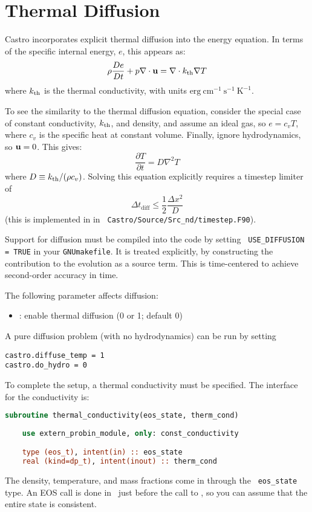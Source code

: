 \label{ch:diffusion}

\section{Thermal Diffusion}

Castro incorporates explicit thermal diffusion into the energy equation.  
In terms of the specific internal energy, $e$, this appears as:
\begin{equation}
\rho \frac{De}{Dt} + p \nabla \cdot {\bf u} = \nabla \cdot {k_\mathrm{th}} \nabla T
\end{equation}
where ${k_\mathrm{th}}$ is the thermal conductivity, with units
$\mathrm{erg~cm^{-1}~s^{-1}~K^{-1}}$.

To see the similarity to the thermal diffusion equation, consider the special
case of constant conductivity, ${k_\mathrm{th}}$, and density, and assume an
ideal gas, so $e = c_v T$, where $c_v$ is the specific heat at constant volume.
Finally, ignore hydrodynamics, so ${\bf u} = 0$.  This gives:
\begin{equation}
\frac{\partial T}{\partial t} = D \nabla^2 T
\end{equation}
where $D \equiv {k_\mathrm{th}}/(\rho c_v)$.  Solving this equation
explicitly requires a timestep limiter of
\begin{equation}
\Delta t_\mathrm{diff} \le \frac{1}{2} \frac{\Delta x^2}{D}
\end{equation}
(this is implemented in  in {\tt
  Castro/Source/Src\_nd/timestep.F90}).

Support for diffusion must be compiled into the code by setting {\tt
  USE\_DIFFUSION = TRUE} in your {\tt GNUmakefile}.  It is treated
explicitly, by constructing the contribution to the evolution as a
source term.  This is time-centered to achieve second-order accuracy
in time.

The following parameter affects diffusion:
\begin{itemize}
\item {}:  enable thermal diffusion (0 or 1; default 0)
\end{itemize}

A pure diffusion problem (with no hydrodynamics) can be run by setting
\begin{verbatim}
castro.diffuse_temp = 1
castro.do_hydro = 0
\end{verbatim}

To complete the setup, a thermal conductivity must be specified.  The
interface for the conductivity is:
\begin{lstlisting}[language=fortran]
  subroutine thermal_conductivity(eos_state, therm_cond)
    
    use extern_probin_module, only: const_conductivity

    type (eos_t), intent(in) :: eos_state
    real (kind=dp_t), intent(inout) :: therm_cond
\end{lstlisting}
The density, temperature, and mass fractions come in through the {\tt
  eos\_state} type.  An EOS call is done in \castro\ just before the
call to , so you can assume that the entire
state is consistent.

